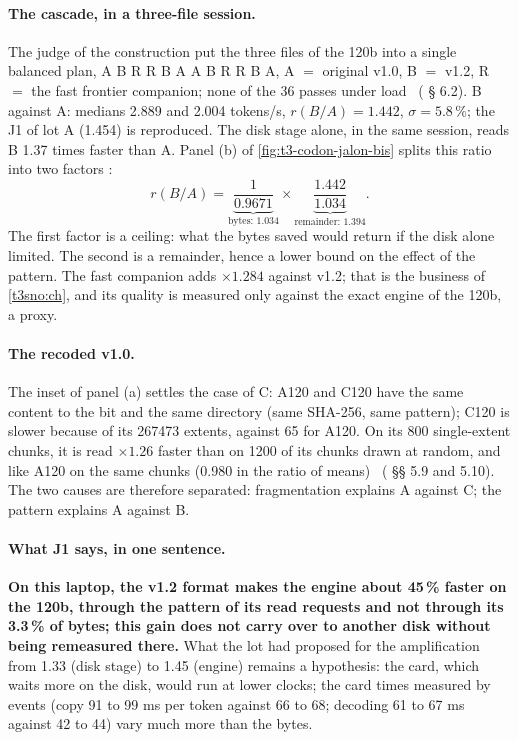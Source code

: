 \paragraph{The cascade, in a three-file session.} The judge of the construction put the three files of the 120b into a single balanced plan, A B R R B A A B R R B A, A $=$ original v1.0, B $=$ v1.2, R $=$ the fast frontier companion; none of the 36 passes under load \mes~( § 6.2). B against A: medians 2.889 and 2.004 tokens/s, $r(B/A) = 1.442$, $\sigma = 5.8\,\%$; the J1 of lot A (1.454) is reproduced. The disk stage alone, in the same session, reads B 1.37 times faster than A. Panel (b) of \cref{fig:t3-codon-jalon-bis} splits this ratio into two factors \calc:
\[
r(B/A) = \underbrace{\frac{1}{0.9671}}_{\text{bytes: } 1.034} \times \underbrace{\frac{1.442}{1.034}}_{\text{remainder: } 1.394}.
\]
The first factor is a ceiling: what the bytes saved would return if the disk alone limited. The second is a remainder, hence a lower bound on the effect of the pattern. The fast companion adds $\times 1.284$ against v1.2; that is the business of \cref{t3sno:ch}, and its quality is measured only against the exact engine of the 120b, a proxy.

\paragraph{The recoded v1.0.} The inset of panel (a) settles the case of C: A120 and C120 have the same content to the bit and the same directory (same SHA-256, same pattern); C120 is slower because of its \num{267473} extents, against 65 for A120. On its 800 single-extent chunks, it is read $\times 1.26$ faster than on \num{1200} of its chunks drawn at random, and like A120 on the same chunks (0.980 in the ratio of means) \mes~( §§ 5.9 and 5.10). The two causes are therefore separated: fragmentation explains A against C; the pattern explains A against B.

\paragraph{What J1 says, in one sentence.} \textbf{On this laptop, the v1.2 format makes the engine about 45\,\% faster on the 120b, through the pattern of its read requests and not through its 3.3\,\% of bytes; this gain does not carry over to another disk without being remeasured there.} What the lot had proposed for the amplification from 1.33 (disk stage) to 1.45 (engine) remains a hypothesis: the card, which waits more on the disk, would run at lower clocks; the card times measured by events (copy 91 to 99 ms per token against 66 to 68; decoding 61 to 67 ms against 42 to 44) vary much more than the bytes.

